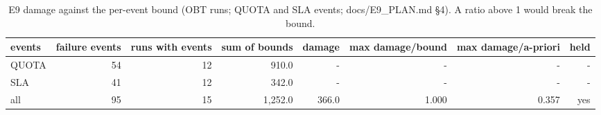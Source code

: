 \begin{table}[t]
\centering
\small
\caption{E9 damage against the per-event bound (OBT runs; QUOTA and SLA events; docs/E9\_PLAN.md §4). A ratio above 1 would break the bound.}
\label{tab:e9_damage_vs_bound}
\begin{tabular}{lrrrrrrr}
\toprule
events & failure events & runs with events & sum of bounds & damage & max damage/bound & max damage/a-priori & held \\
\midrule
QUOTA & 54 & 12 & 910.0 & - & - & - & - \\
SLA & 41 & 12 & 342.0 & - & - & - & - \\
all & 95 & 15 & 1,252.0 & 366.0 & 1.000 & 0.357 & yes \\
\bottomrule
\end{tabular}
\end{table}
